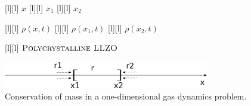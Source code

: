 \begin{figure}[ht]
	\centering
	\footnotesize

	[l] {$x$}
	[l] {$x_1$}
	[l] {$x_2$}

	[l] {$\rho(x,t)$}
	[l] {$\rho(x_{1},t)$}
	[l] {$\rho(x_{2},t)$}


	[l] {$\textsc{Polycrystalline LLZO}$}

	\includegraphics[width=0.8\textwidth]{massx1x2.eps}
	\caption{Conservation of mass in a one-dimensional gas dynamics problem.}
	\label{\LABEL}
\end{figure}
